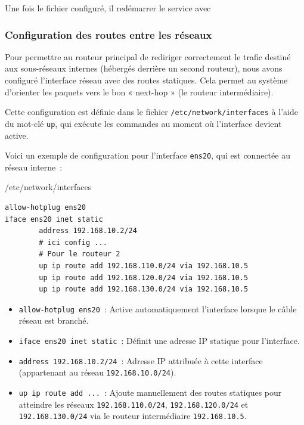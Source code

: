 \documentclass{article}
\begin{document}
Une fois le fichier configuré, il redémarrer le service avec 

\subsubsection{Configuration des routes entre les réseaux}

Pour permettre au routeur principal de rediriger correctement le trafic destiné aux sous-réseaux internes (hébergés derrière un second routeur), nous avons configuré l’interface réseau avec des routes statiques. Cela permet au système d’orienter les paquets vers le bon « next-hop » (le routeur intermédiaire).

Cette configuration est définie dans le fichier \texttt{/etc/network/interfaces} à l’aide du mot-clé \texttt{up}, qui exécute les commandes au moment où l’interface devient active.

Voici un exemple de configuration pour l’interface \texttt{ens20}, qui est connectée au réseau interne~:

\begin{configbox}{/etc/network/interfaces}
\begin{lstlisting}
allow-hotplug ens20
iface ens20 inet static
        address 192.168.10.2/24
        # ici config ...
        # Pour le routeur 2
        up ip route add 192.168.110.0/24 via 192.168.10.5
        up ip route add 192.168.120.0/24 via 192.168.10.5
        up ip route add 192.168.130.0/24 via 192.168.10.5
\end{lstlisting}
\end{configbox}

\begin{itemize}
  \item \texttt{allow-hotplug ens20}~: Active automatiquement l'interface lorsque le câble réseau est branché.
  \item \texttt{iface ens20 inet static}~: Définit une adresse IP statique pour l'interface.
  \item \texttt{address 192.168.10.2/24}~: Adresse IP attribuée à cette interface (appartenant au réseau \texttt{192.168.10.0/24}).
  \item \texttt{up ip route add ...}~: Ajoute manuellement des routes statiques pour atteindre les réseaux \texttt{192.168.110.0/24}, \texttt{192.168.120.0/24} et \texttt{192.168.130.0/24} via le routeur intermédiaire \texttt{192.168.10.5}.
\end{itemize}
\end{document}
